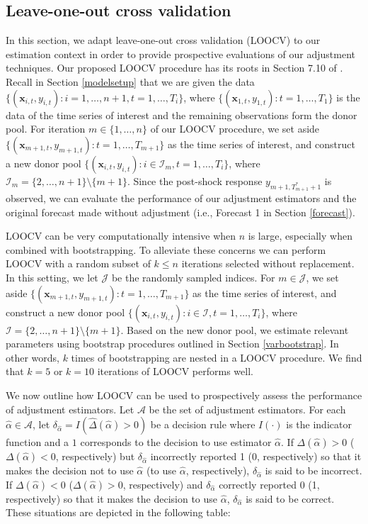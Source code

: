 \documentclass[11pt,3p,review,authoryear]{elsarticle}
\def\mbf#1{\mathbf{#1}} %
\def\mc#1{\mathcal{#1}} %
\theoremstyle{definition}
\begin{document}
\subsection{Leave-one-out cross validation}
\label{loocv}

In this section, we adapt leave-one-out cross validation (LOOCV) to our estimation context in order to provide prospective evaluations of our adjustment techniques. Our proposed LOOCV procedure has its roots in Section 7.10 of \citet{hastie2009elements}.  Recall in Section \ref{modelsetup} that we are given the data $\{(\mbf{x}_{i,t}, y_{i,t}) \colon i = 1, \ldots, n+1, t = 1, \ldots, T_i\}$, where $\{(\mbf{x}_{1,t}, y_{1,t})\colon t = 1, \ldots, T_1\}$ is the data of the time series of interest and the remaining observations form the donor pool. For iteration $m \in \{1,\ldots,n\}$ of our LOOCV procedure, we set aside $\{(\mbf{x}_{m + 1, t}, y_{m + 1, t}) \colon t = 1, \ldots, T_{m+1}\}$ as the time series of interest, and construct a new donor pool $\{(\mbf{x}_{i, t}, y_{i, t}) \colon i \in \mc{I}_m, t = 1, \ldots, T_{i}\}$, where $\mc{I}_m=\{2, \ldots, n+1\} \setminus \{m+1\}$. Since the post-shock response $y_{m+1, T_{m+1}^*+1}$ is observed, we can evaluate the performance of our adjustment estimators and the original forecast made without adjustment (i.e., Forecast 1 in Section \ref{forecast}).

LOOCV can be very computationally intensive when $n$ is large, especially when combined with bootstrapping. To alleviate these concerns we can perform LOOCV with a random subset of $k \leq n$ iterations selected without replacement. In this setting, we let $\mc{J}$ be the randomly sampled indices. For $m \in \mc{J}$, we set aside $\{(\mbf{x}_{m + 1, t}, y_{m + 1, t}) \colon t = 1, \ldots, T_{m+1}\}$ as the time series of interest, and construct a new donor pool $\{(\mbf{x}_{i, t}, y_{i, t}) \colon i \in \mc{I}, t = 1, \ldots, T_{i}\}$, where $\mc{I}=\{2, \ldots, n+1\} \setminus \{m+1\}$. Based on the new donor pool, we estimate relevant parameters using bootstrap procedures outlined in Section \ref{varbootstrap}. In other words, $k$ times of bootstrapping are nested in a LOOCV procedure.  We find that $k=5$ or $k=10$ iterations of LOOCV performs well.

We now outline how LOOCV can be used to prospectively assess the performance of adjustment estimators. Let $\mc{A}$ be the set of adjustment estimators. For each $\hat{\alpha} \in \mc{A}$, let $\delta_{\hat{\alpha}} = I(\hat\Delta(\hat{\alpha})>0)$ be a decision rule where $I(\cdot)$ is the indicator function and a $1$ corresponds to the decision to use  estimator $\hat\alpha$. If $\Delta(\hat{\alpha})>0$ ($\Delta(\hat{\alpha})<0$, respectively) but $\delta_{\hat{\alpha}}$ incorrectly reported 1 (0, respectively) so that it makes the decision not to use $\hat{\alpha}$ (to use $\hat{\alpha}$, respectively), $\delta_{\hat{\alpha}}$ is said to be incorrect. If $\Delta(\hat{\alpha})<0$ ($\Delta(\hat{\alpha})>0$, respectively) and  $\delta_{\hat{\alpha}}$ correctly reported 0 (1, respectively) so that it makes the decision to use $\hat{\alpha}$, $\delta_{\hat{\alpha}}$ is said to be correct. These situations are depicted in the following table: \vspace*{0.3cm}
\end{document}
